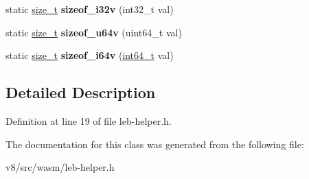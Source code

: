 \begin{DoxyCompactItemize}
static \mbox{\hyperlink{classsize__t}{size\+\_\+t}} {\bfseries sizeof\+\_\+i32v} (int32\+\_\+t val)
\item 
\mbox{\label{classv8_1_1internal_1_1wasm_1_1LEBHelper_abed11129ef84573c009ab5b02b8ce80c}} 
static \mbox{\hyperlink{classsize__t}{size\+\_\+t}} {\bfseries sizeof\+\_\+u64v} (uint64\+\_\+t val)
\item 
\mbox{\label{classv8_1_1internal_1_1wasm_1_1LEBHelper_a04cf5f27e8487bfdb67ab7bf1bd8ac6c}} 
static \mbox{\hyperlink{classsize__t}{size\+\_\+t}} {\bfseries sizeof\+\_\+i64v} (\mbox{\hyperlink{classint64__t}{int64\+\_\+t}} val)
\end{DoxyCompactItemize}


\subsection{Detailed Description}


Definition at line 19 of file leb-\/helper.\+h.



The documentation for this class was generated from the following file\+:\begin{DoxyCompactItemize}
\item 
v8/src/wasm/leb-\/helper.\+h\end{DoxyCompactItemize}

